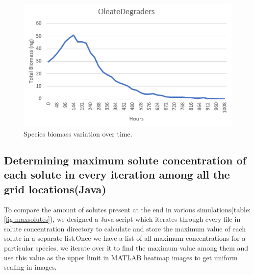 \begin{figure}[htbp]
\centering
\includegraphics[width=1.0\textwidth]{images/speciesgraph.PNG}
\caption{Species biomass variation over time. }
\label{fig:speciesgraph}
\end{figure}

\subsection{Determining maximum solute concentration of each solute in every iteration among all the grid locations(Java)}

To compare the amount of solutes present at the end in various simulations(table:\ref{fig:maxsolutes}), we designed a Java script which iterates through every file in solute concentration directory to calculate and store the maximum value of each solute in a separate list.Once we have a list of all maximum concentrations for a particular species, we iterate over it to find the maximum value among them and use this value as the upper limit in MATLAB heatmap images to get uniform scaling in images. 

